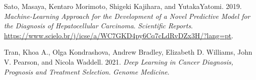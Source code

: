 \documentclass[
]{article}
\newlength{\cslhangindent}
\newlength{\cslentryspacingunit} %
\newenvironment{CSLReferences}[2] %
 {%
  \setlength{\parindent}{0pt}
  \ifodd #1
  \let\oldpar\par
  \def\par{\hangindent=\cslhangindent\oldpar}
  \fi
  \setlength{\parskip}{#2\cslentryspacingunit}
 }%
 {}
\begin{document}
\begin{CSLReferences}{1}{0}
\leavevmode{}%
Sato, Masaya, Kentaro Morimoto, Shigeki Kajihara, and YutakaYatomi.
2019. \emph{Machine-Learning Approach for the Development of a Novel
Predictive Model for the Diagnosis of Hepatocellular Carcinoma}.
\emph{Scientific Reports}.
\url{https://www.scielo.br/j/icse/a/WC7GKD4py6Cq7cLdRvDZx3H/?lang=pt}.

\leavevmode{}%
Tran, Khoa A., Olga Kondrashova, Andrew Bradley, Elizabeth D. Williams,
John V. Pearson, and Nicola Waddell. 2021. \emph{Deep Learning in Cancer
Diagnosis, Prognosis and Treatment Selection}. \emph{Genome Medicine}.

\end{CSLReferences}
\end{document}
